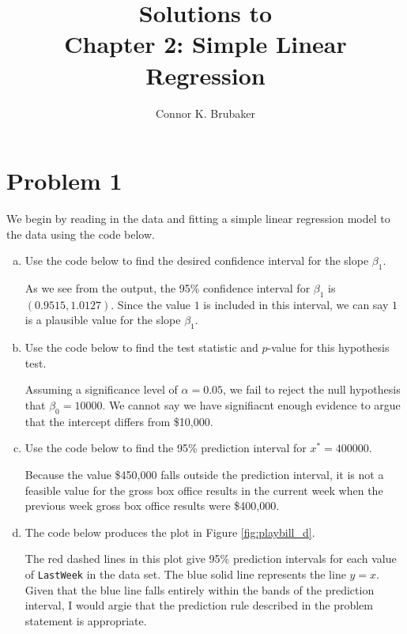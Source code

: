 \documentclass{amsart}
\title[Ch. 2: Simple Linear Regression]{Solutions to\\Chapter 2: Simple Linear Regression}
\author{Connor K. Brubaker}
\begin{document}
    \maketitle
    \section*{Problem 1}
    We begin by reading in the data and fitting a simple linear regression model to the data using the code below.
    
    \begin{enumerate}[(a)]
        \item Use the code below to find the desired confidence interval for the slope $\beta_1$.
        
        As we see from the output, the 95\% confidence interval for $\beta_1$ is $(0.9515, 1.0127)$. Since the value $1$ is included in this interval, we can say $1$ is a plausible value for the slope $\beta_1$.
        
        \item Use the code below to find the test statistic and $p$-value for this hypothesis test.
        
        Assuming a significance level of $\alpha = 0.05$, we fail to reject the null hypothesis that $\beta_0 = 10000$. We cannot say we have signifiacnt enough evidence to argue that the intercept differs from \$10,000. 

        \item Use the code below to find the 95\% prediction interval for $x^* = 400000$.
        
        Because the value \$450,000 falls outside the prediction interval, it is not a feasible value for the gross box office results in the current week when the previous week gross box office results were \$400,000. 

        \item The code below produces the plot in Figure \ref{fig:playbill_d}. 
        
        The red dashed lines in this plot give 95\% prediction intervals for each value of \texttt{LastWeek} in the data set. The blue solid line represents the line $y = x$. Given that the blue line falls entirely within the bands of the prediction interval, I would argie that the prediction rule described in the problem statement is appropriate.
    \end{enumerate}
\end{document}
